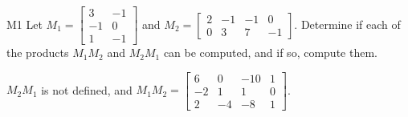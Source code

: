 \begin{problem}{M1} 
Let $M_1 = \begin{bmatrix} 3 & -1 \\ -1  & 0 \\ 1 & -1 \end{bmatrix}$ and $M_2 = \begin{bmatrix} 2 & -1 & -1 & 0 \\ 0 & 3 & 7 & -1 \end{bmatrix}$.  Determine if each of the products $M_1M_2$ and $M_2M_1$ can be computed, and if so, compute them.
\end{problem}
\begin{solution}
$M_2M_1$ is not defined, and $M_1M_2 = \begin{bmatrix} 6 & 0 & -10 & 1 \\ -2 & 1 & 1 & 0 \\ 2 & -4 & -8 & 1 \end{bmatrix}$.
\end{solution}
